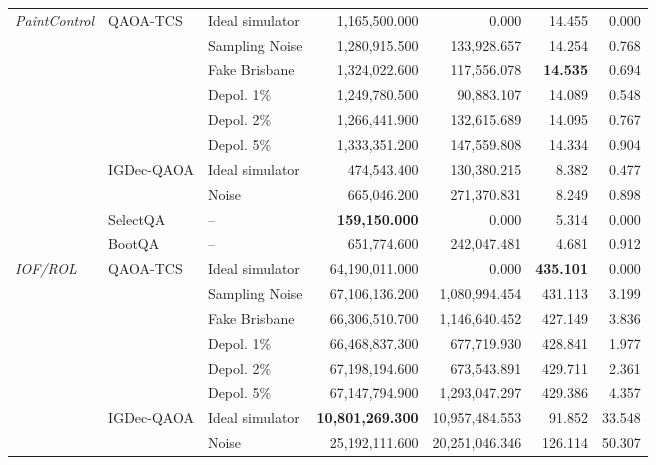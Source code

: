 \begin{table}[ht]
{\begin{tabular}{lllrrrr}
\multirow{10}{*}{\textit{PaintControl}} &
\multirow{6}{*}{QAOA-TCS}
  & Ideal simulator & 1,165,500.000 & 0.000      & 14.455 & 0.000 \\
& & Sampling Noise   & 1,280,915.500 & 133,928.657 & 14.254 & 0.768 \\
& & Fake Brisbane   & 1,324,022.600 & 117,556.078 & \textbf{14.535} & 0.694 \\
& & Depol. 1\%      & 1,249,780.500 & 90,883.107  & 14.089 & 0.548 \\
& & Depol. 2\%      & 1,266,441.900 & 132,615.689 & 14.095 & 0.767 \\
& & Depol. 5\%      & 1,333,351.200 & 147,559.808 & 14.334 & 0.904 \\
\cmidrule(lr){2-7}
& \multirow{2}{*}{IGDec-QAOA}
  & Ideal simulator & 474,543.400 & 130,380.215 & 8.382 & 0.477 \\
& & Noise           & 665,046.200 & 271,370.831 & 8.249 & 0.898 \\
\cmidrule(lr){2-7}
& SelectQA   & --    & \textbf{159,150.000} & 0.000      & 5.314 & 0.000 \\
& BootQA     & --    & 651,774.600 & 242,047.481 & 4.681 & 0.912 \\
\midrule

\multirow{8}{*}{\textit{IOF/ROL}} &
\multirow{6}{*}{QAOA-TCS}
  & Ideal simulator & 64,190,011.000 & 0.000 & \textbf{435.101} & 0.000 \\
& & Sampling Noise   & 67,106,136.200 & 1,080,994.454 & 431.113 & 3.199 \\
& & Fake Brisbane   & 66,306,510.700 & 1,146,640.452 & 427.149 & 3.836 \\
& & Depol. 1\%      & 66,468,837.300 & 677,719.930  & 428.841 & 1.977 \\
& & Depol. 2\%      & 67,198,194.600 & 673,543.891  & 429.711 & 2.361 \\
& & Depol. 5\%      & 67,147,794.900 & 1,293,047.297 & 429.386 & 4.357 \\
\cmidrule(lr){2-7}
& \multirow{2}{*}{IGDec-QAOA}
  & Ideal simulator & \textbf{10,801,269.300} & 10,957,484.553 & 91.852 & 33.548 \\
& & Noise           & 25,192,111.600 & 20,251,046.346 & 126.114 & 50.307 \\
\bottomrule
\end{tabular}}
\end{table}

